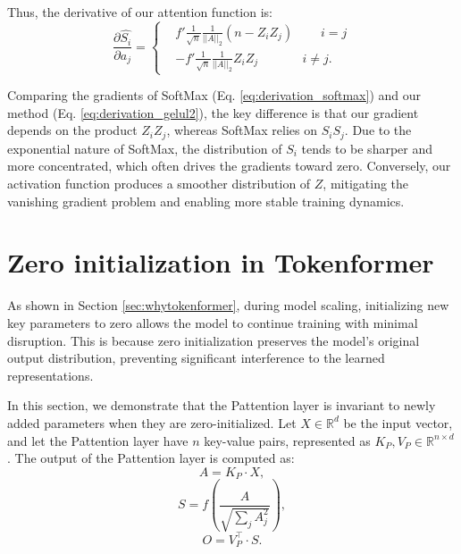 \documentclass{article} %
\newcommand{\ourmethod}{Tokenformer\xspace}
\begin{document}
Thus, the derivative of our attention function is:
\begin{equation}
    \frac{\partial \hat{S_i}}{\partial a_j} = 
        \left\{
            \begin{aligned}
            & f' \frac{1}{\sqrt{n}} \frac{1}{||A||_2} (n - Z_i Z_j)~~~~~~~~~~i=j\\
            & - f' \frac{1}{\sqrt{n}} \frac{1}{||A||_2} Z_i Z_j~~~~~~~~~~~~~~~~i\neq j.
            \end{aligned}
        \right.
\label{eq:derivation_gelul2}
\end{equation}

Comparing the gradients of SoftMax (Eq. \ref{eq:derivation_softmax}) and our method (Eq. \ref{eq:derivation_gelul2}), the key difference is that our gradient depends on the product $Z_i Z_j$, whereas SoftMax relies on $S_i S_j$. Due to the exponential nature of SoftMax, the distribution of $S_i$ tends to be sharper and more concentrated, which often drives the gradients toward zero. Conversely, our activation function produces a smoother distribution of $Z$, mitigating the vanishing gradient problem and enabling more stable training dynamics.

\section{Zero initialization in \ourmethod} \label{appedix:zero}
As shown in Section \ref{sec:whytokenformer}, during model scaling, initializing new key parameters to zero allows the model to continue training with minimal disruption. 
This is because zero initialization preserves the model's original output distribution, preventing significant interference to the learned representations.

In this section, we demonstrate that the Pattention layer is invariant to newly added parameters when they are zero-initialized. 
Let $X \in \mathbb{R}^d$ be the input vector, and let the Pattention layer have $n$ key-value pairs, represented as $K_P, V_P \in \mathbb{R}^{n \times d}$. The output of the Pattention layer is computed as:
\begin{equation}
    A = K_P \cdot X,
    \label{eq:token-parameter-1}
\end{equation}
\begin{equation}
    S = f(\frac{A}{\sqrt{\sum_j A_j^2}}),
    \label{eq:token-parameter-2}
\end{equation}
\begin{equation}
    O = V_P^{\top} \cdot S.
    \label{eq:token-parameter-2}
\end{equation}
\end{document}

